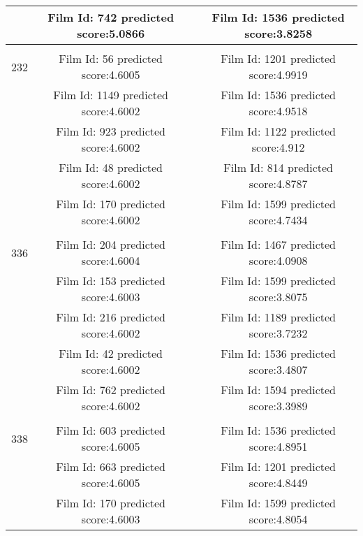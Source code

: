 \begin{longtable}{|c|c|c|c|}
\hline
\multicolumn{ 1}{|c|}{} & Film Id: 742 predicted score:5.0866 &            & Film Id: 1536 predicted score:3.8258 \\
\hline
           &            &            &            \\
\hline
\multicolumn{ 1}{|c|}{232} & Film Id: 56 predicted score:4.6005 &            & Film Id: 1201 predicted score:4.9919 \\
\hline
\multicolumn{ 1}{|c|}{} & Film Id: 1149 predicted score:4.6002 &            & Film Id: 1536 predicted score:4.9518 \\
\hline
\multicolumn{ 1}{|c|}{} & Film Id: 923 predicted score:4.6002 &            & Film Id: 1122 predicted score:4.912 \\
\hline
\multicolumn{ 1}{|c|}{} & Film Id: 48 predicted score:4.6002 &            & Film Id: 814 predicted score:4.8787 \\
\hline
\multicolumn{ 1}{|c|}{} & Film Id: 170 predicted score:4.6002 &            & Film Id: 1599 predicted score:4.7434 \\
\hline
           &            &            &            \\
\hline
\multicolumn{ 1}{|c|}{336} & Film Id: 204 predicted score:4.6004 &            & Film Id: 1467 predicted score:4.0908 \\
\hline
\multicolumn{ 1}{|c|}{} & Film Id: 153 predicted score:4.6003 &            & Film Id: 1599 predicted score:3.8075 \\
\hline
\multicolumn{ 1}{|c|}{} & Film Id: 216 predicted score:4.6002 &            & Film Id: 1189 predicted score:3.7232 \\
\hline
\multicolumn{ 1}{|c|}{} & Film Id: 42 predicted score:4.6002 &            & Film Id: 1536 predicted score:3.4807 \\
\hline
\multicolumn{ 1}{|c|}{} & Film Id: 762 predicted score:4.6002 &            & Film Id: 1594 predicted score:3.3989 \\
\hline
           &            &            &            \\
\hline
\multicolumn{ 1}{|c|}{338} & Film Id: 603 predicted score:4.6005 &            & Film Id: 1536 predicted score:4.8951 \\
\hline
\multicolumn{ 1}{|c|}{} & Film Id: 663 predicted score:4.6005 &            & Film Id: 1201 predicted score:4.8449 \\
\hline
\multicolumn{ 1}{|c|}{} & Film Id: 170 predicted score:4.6003 &            & Film Id: 1599 predicted score:4.8054 \\

\end{longtable}
